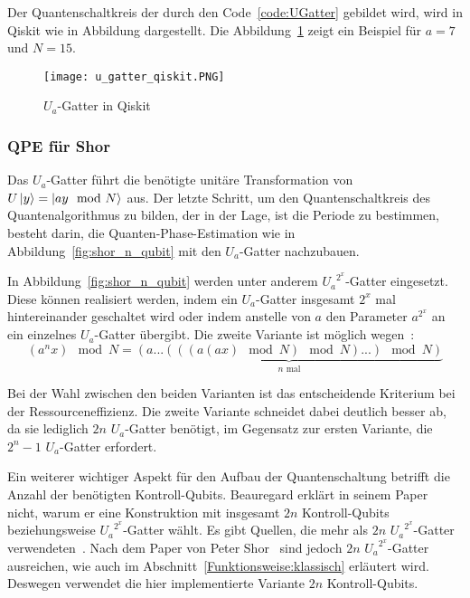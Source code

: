 Der Quantenschaltkreis der durch den Code~\ref{code:UGatter} gebildet wird, 
wird in Qiskit wie in Abbildung dargestellt. 
Die Abbildung~\ref{fig:u_gatter_qiskit} zeigt ein Beispiel für \(a=7\) und \(N=15\).

\begin{figure} [H]
  \caption{\(U_a\)-Gatter in Qiskit}
  \label{fig:u_gatter_qiskit}
  \texttt{[image: u\_gatter\_qiskit.PNG]}
  \centering
  \end{figure}

\subsubsection{QPE für Shor} \label{section:imp_QPE_Shor}
Das \(U_a\)-Gatter führt die benötigte unitäre Transformation von \(U\ket{y} = \ket{ay \mod N}\) aus.
Der letzte Schritt, um den Quantenschaltkreis des Quantenalgorithmus zu bilden, 
der in der Lage, ist die Periode zu bestimmen, 
besteht darin, 
die Quanten-Phase-Estimation wie in Abbildung~\ref{fig:shor_n_qubit} mit den \(U_a\)-Gatter nachzubauen.

In Abbildung~\ref{fig:shor_n_qubit} werden unter anderem \({U_a}^{2^x}\)-Gatter eingesetzt.
Diese können realisiert werden, 
indem ein \({U_a}\)-Gatter insgesamt \(2^x\) mal hintereinander geschaltet wird oder 
indem anstelle von \(a\) den Parameter \(a^{2^x}\) an ein einzelnes \(U_a\)-Gatter übergibt.
Die zweite Variante ist möglich wegen~\cite{beauregard2003circuit}:
\[(a^nx)\mod N = \underbrace{(a...(((a(ax)\mod N)\mod N)...)\mod N)}_{\text{\(n\) mal}}\]

Bei der Wahl zwischen den beiden Varianten ist das entscheidende Kriterium bei der Ressourceneffizienz. 
Die zweite Variante schneidet dabei deutlich besser ab, da sie lediglich \(2n\) \(U_a\)-Gatter benötigt, 
im Gegensatz zur ersten Variante, die \(2^n-1\) \(U_a\)-Gatter erfordert.

Ein weiterer wichtiger Aspekt für den Aufbau der Quantenschaltung betrifft die Anzahl der benötigten Kontroll-Qubits.
Beauregard erklärt in seinem Paper~\cite{beauregard2003circuit} nicht, 
warum er eine Konstruktion mit insgesamt \(2n\) Kontroll-Qubits beziehungsweise \({U_a}^{2^x}\)-Gatter wählt.
Es gibt Quellen, die mehr als \(2n\) \({U_a}^{2^x}\)-Gatter verwendeten~\cite{nielsen_chuang_2010}.
Nach dem Paper von Peter Shor~\cite{Shor_1997} sind jedoch \(2n\) \({U_a}^{2^x}\)-Gatter ausreichen,
wie auch im Abschnitt~\ref{Funktionsweise:klassisch} erläutert wird.
Deswegen verwendet die hier implementierte Variante \(2n\) Kontroll-Qubits.


